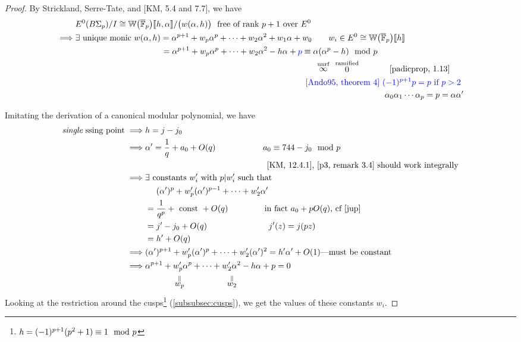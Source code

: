 \documentclass{rs}
\theoremstyle{definition}
\theoremstyle{remark}
\newcommand{\mb}[1]{\mathbb{#1}}
\newcommand{\cF}{\overline {\mb F}}
\newcommand{\BW}{{\mb W}}
\newcommand{\md}{~~{\rm mod}~}
\newcommand{\A}{\alpha}
\newcommand{\lb}{\llbracket}
\newcommand{\rb}{\rrbracket}
\renewcommand{\=}{\approx}
\renewcommand{\-}{\sim}
\newcommand{\bl}[1]{\textcolor{blue}{#1}}
\numberwithin{equation}{section}
\numberwithin{thm}{section}
\begin{document}
\begin{proof}
 By Strickland, Serre-Tate, and [KM, 5.4 and 7.7], we have 
 \begin{equation*}
  \begin{split}
   & E^0(B\Sigma_p)/I \cong \BW\big(\cF_p\big)\lb h,\A \rb / \big(w(\A,h)\big) 
     ~~ \text{free of rank $p + 1$ over $E^0$} \\
   \implies & \exists ~ \text{unique monic} ~ 
              w(\A,h) = \A^{p + 1} + w_p \A^p + \cdots + w_2 \A^2 + w_1 \A + w_0 
              \qquad w_i \in E^0 \cong \BW\big(\cF_p\big)\lb h \rb \\
   & \hskip 3.63cm = \A^{p + 1} + w_p \A^p + \cdots + w_2 \A^2 - h \A + \bl{p} 
              \equiv \A (\A^p - h) \md p \\
   & \hskip 10.15cm \stackrel{\text{unrf}}{\infty} \hskip .25cm \stackrel{\text{ramified}}{0} \hskip 1.2cm \text{[padicprop, 1.13]} \\
   & \hskip 9.75cm \bl{\text{[Ando95, theorem 4] $(-1)^{p + 1} p = p$ if $p > 2$}} \\
   & \hskip 13.1cm \A_0 \A_1 \cdots \A_p = p = \A \A' 
  \end{split}
 \end{equation*}

 Imitating the derivation of a canonical modular polynomial, we have 
 \begin{equation*}
  \begin{split}
   \text{{\em single} ssing point} \implies & h = j - j_0 \\
   \implies & \A' = \frac{1}{q} + a_0 + O(q) \hskip 2cm a_0 \equiv 744 - j_0 \md p \\
   & \hskip 5.14cm \text{[KM, 12.4.1], [p3, remark 3.4] should work integrally} \\
   \implies & \exists ~ \text{constants $w_i'$ with $p|w_i'$ such that} \\
   & \quad~ (\A')^p + w_p' (\A')^{p - 1} + \cdots + w_2' \A' \\
   & = \frac{1}{q^p} + ~ \text{const} ~ + O(q) \hskip 1.54cm \text{in fact $a_0 + p O(q)$, cf \eqref{jup}} \\
   & = j' - j_0 + O(q) \hskip 2.6cm j'(z) = j(p z) \\
   & = h' + O(q) \\
   \implies & (\A')^{p + 1} + w_p' (\A')^p + \cdots + w_2' (\A')^2 
              = h' \A' + O(1) \text{---must be constant} \\
   \implies & \A^{p + 1} + w_p' \A^p + \cdots + w_2' \A^2 - h \A + p = 0 \\
   & \hskip 1.15cm \stackrel{\|}{w_p} \hskip 1.8cm \stackrel{\|}{w_2} 
  \end{split}
 \end{equation*}
 Looking at the restriction around the cusps\footnote{$h = (-1)^{p + 1} (p^2 + 1) \equiv 1 \md p$} (\ref{subsubsec:cusps}), 
 we get the values of these constants $w_i$.  
\end{proof}
\end{document}
